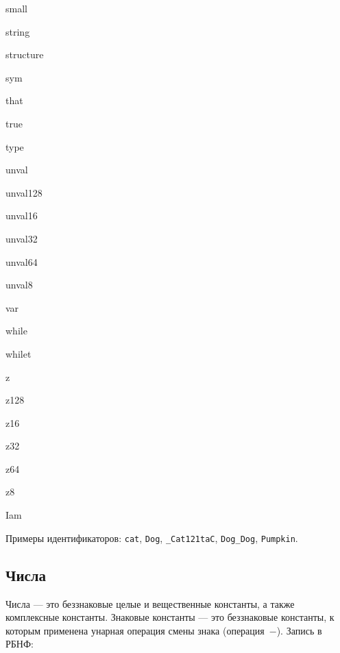 \documentclass[10pt]{report}
\begin{document}
\begin{multicols}{4}
small

string

structure

sym

that

true

type

unval

unval128

unval16

unval32

unval64

unval8

var

while

whilet

z

z128

z16

z32

z64

z8

 Iam

\end{multicols}

Примеры идентификаторов: \texttt{cat}, \texttt{Dog}, \texttt{_Cat121taC}, \texttt{Dog_Dog}, \texttt{Pumpkin}.    


        \subsection{Числа}
Числа --- это беззнаковые целые и вещественные константы, а также комплексные константы. Знаковые константы --- это беззнаковые константы, к которым применена унарная операция смены знака
(операция\ \glqq$-$\grqq). Запись в РБНФ:
\end{document}
